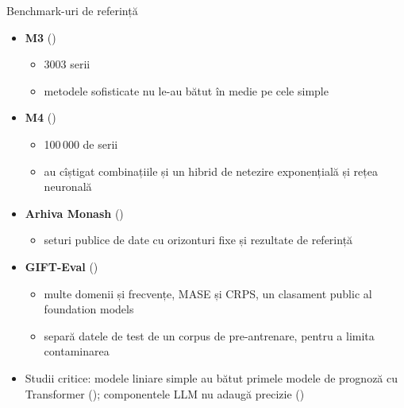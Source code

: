 \begin{frame}{Benchmark-uri de referință}
\itemsize{\footnotesize}
\begin{itemize}
    \item \textbf{M3} ()
    \begin{itemize}
        \item 3003 serii
        \item metodele sofisticate nu le-au bătut în medie pe cele simple
    \end{itemize}
    \item \textbf{M4} ()
    \begin{itemize}
        \item 100\,000 de serii
        \item au cîștigat combinațiile și un hibrid de netezire exponențială și rețea neuronală
    \end{itemize}
    \item \textbf{Arhiva Monash} ()
    \begin{itemize}
        \item seturi publice de date cu orizonturi fixe și rezultate de referință
    \end{itemize}
    \item \textbf{GIFT-Eval} ()
    \begin{itemize}
        \item multe domenii și frecvențe, MASE și CRPS, un clasament public al foundation models
        \item separă datele de test de un corpus de pre-antrenare, pentru a limita contaminarea
    \end{itemize}
    \item Studii critice: modele liniare simple au bătut primele modele de prognoză cu Transformer (); componentele LLM nu adaugă precizie ()
\end{itemize}
\end{frame}

